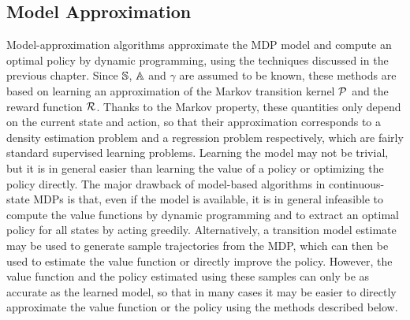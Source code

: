 \subsection{Model Approximation}
Model-approximation algorithms approximate the MDP model and compute an optimal policy by dynamic programming, using the techniques discussed in the previous chapter. Since $\S$, $\A$ and $\gamma$ are assumed to be known, these methods are based on learning an approximation of the Markov transition kernel $\calP$ and the reward function $\calR$. Thanks to the Markov property, these quantities only depend on the current state and action, so that their approximation corresponds to a density estimation problem and a regression problem respectively, which are fairly standard supervised learning problems. Learning the model may not be trivial, but it is in general easier than learning the value of a policy or optimizing the policy directly. The major drawback of model-based algorithms in continuous-state MDPs is that, even if the model is available, it is in general infeasible to compute the value functions by dynamic programming and to extract an optimal policy for all states by acting greedily. Alternatively, a transition model estimate may be used to generate sample trajectories from the MDP, which can then be used to estimate the value function or directly improve the policy. However, the value function and the policy estimated using these samples can only be as accurate as the learned model, so that in many cases it may be easier to directly approximate the value function or the policy using the methods described below. 

